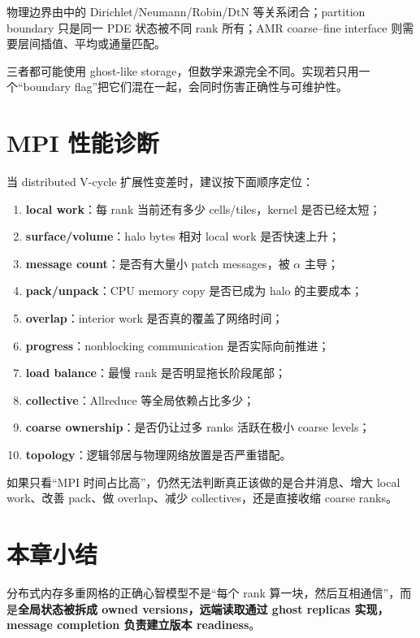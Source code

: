 物理边界由中的 Dirichlet/Neumann/Robin/DtN 等关系闭合；partition boundary 只是同一 PDE 状态被不同 rank 所有；AMR coarse--fine interface 则需要层间插值、平均或通量匹配。

三者都可能使用 ghost-like storage，但数学来源完全不同。实现若只用一个“boundary flag”把它们混在一起，会同时伤害正确性与可维护性。

\section{MPI 性能诊断}

当 distributed V-cycle 扩展性变差时，建议按下面顺序定位：

\begin{enumerate}
\item \textbf{local work}：每 rank 当前还有多少 cells/tiles，kernel 是否已经太短；
\item \textbf{surface/volume}：halo bytes 相对 local work 是否快速上升；
\item \textbf{message count}：是否有大量小 patch messages，被 $\alpha$ 主导；
\item \textbf{pack/unpack}：CPU memory copy 是否已成为 halo 的主要成本；
\item \textbf{overlap}：interior work 是否真的覆盖了网络时间；
\item \textbf{progress}：nonblocking communication 是否实际向前推进；
\item \textbf{load balance}：最慢 rank 是否明显拖长阶段尾部；
\item \textbf{collective}：Allreduce 等全局依赖占比多少；
\item \textbf{coarse ownership}：是否仍让过多 ranks 活跃在极小 coarse levels；
\item \textbf{topology}：逻辑邻居与物理网络放置是否严重错配。
\end{enumerate}

如果只看“MPI 时间占比高”，仍然无法判断真正该做的是合并消息、增大 local work、改善 pack、做 overlap、减少 collectives，还是直接收缩 coarse ranks。

\section{本章小结}

分布式内存多重网格的正确心智模型不是“每个 rank 算一块，然后互相通信”，而是\textbf{全局状态被拆成 owned versions，远端读取通过 ghost replicas 实现，message completion 负责建立版本 readiness}。

